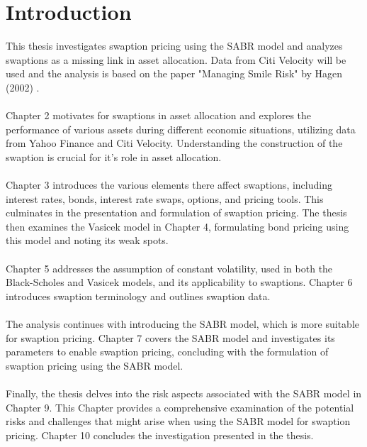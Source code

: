 \section{Introduction}

This thesis investigates swaption pricing using the SABR model
and analyzes swaptions as a missing link in asset allocation. 
Data from Citi Velocity will be used and the analysis is 
based on the paper "Managing Smile Risk" by Hagen (2002) 
\cite{Smile}.
\\\\
Chapter 2 motivates for swaptions 
in asset allocation and explores the performance 
of various assets during different economic situations, 
utilizing data from Yahoo Finance and Citi Velocity. 
Understanding the construction of the swaption
is crucial for it's role in asset allocation.
\\\\
Chapter 3 introduces the various elements there affect 
swaptions, including interest rates, bonds, interest 
rate swaps, options, and pricing tools. This culminates 
in the presentation and formulation of swaption pricing. 
The thesis then examines the Vasicek model in Chapter 4, 
formulating bond pricing using this model and noting its 
weak spots.
\\\\
Chapter 5 addresses the assumption of constant volatility, 
used in both the Black-Scholes and Vasicek models, 
and its applicability to swaptions. Chapter 6 introduces 
swaption terminology and outlines swaption data.
\\\\
The analysis continues with introducing the SABR model, which is 
more suitable for swaption pricing. Chapter 7 covers the SABR model 
and investigates its parameters to enable swaption pricing, 
concluding with the formulation of swaption pricing using 
the SABR model.
\\\\
Finally, the thesis delves into the risk aspects associated 
with the SABR model in Chapter 9. This Chapter provides a 
comprehensive examination of the potential risks and 
challenges that might arise when using the SABR model 
for swaption pricing.
Chapter 10 concludes the investigation presented in the thesis. 
